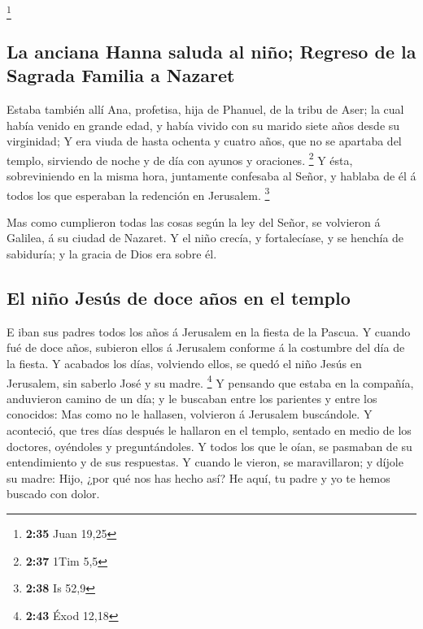 \footnote{\textbf{2:35} Juan 19,25}

\hypertarget{la-anciana-hanna-saluda-al-niuxf1o-regreso-de-la-sagrada-familia-a-nazaret}{%
\subsection{La anciana Hanna saluda al niño; Regreso de la Sagrada
Familia a
Nazaret}\label{la-anciana-hanna-saluda-al-niuxf1o-regreso-de-la-sagrada-familia-a-nazaret}}

 Estaba también allí Ana, profetisa, hija de Phanuel, de la
tribu de Aser; la cual había venido en grande edad, y había vivido con
su marido siete años desde su virginidad;  Y era viuda de
hasta ochenta y cuatro años, que no se apartaba del templo, sirviendo de
noche y de día con ayunos y oraciones. \footnote{\textbf{2:37} 1Tim 5,5}
 Y ésta, sobreviniendo en la misma hora, juntamente
confesaba al Señor, y hablaba de él á todos los que esperaban la
redención en Jerusalem. \footnote{\textbf{2:38} Is 52,9}

 Mas como cumplieron todas las cosas según la ley del
Señor, se volvieron á Galilea, á su ciudad de Nazaret.  Y
el niño crecía, y fortalecíase, y se henchía de sabiduría; y la gracia
de Dios era sobre él.

\hypertarget{el-niuxf1o-jesuxfas-de-doce-auxf1os-en-el-templo}{%
\subsection{El niño Jesús de doce años en el
templo}\label{el-niuxf1o-jesuxfas-de-doce-auxf1os-en-el-templo}}

 E iban sus padres todos los años á Jerusalem en la fiesta
de la Pascua.  Y cuando fué de doce años, subieron ellos á
Jerusalem conforme á la costumbre del día de la fiesta.  Y
acabados los días, volviendo ellos, se quedó el niño Jesús en Jerusalem,
sin saberlo José y su madre. \footnote{\textbf{2:43} Éxod 12,18}
 Y pensando que estaba en la compañía, anduvieron camino de
un día; y le buscaban entre los parientes y entre los conocidos:
 Mas como no le hallasen, volvieron á Jerusalem buscándole.
 Y aconteció, que tres días después le hallaron en el
templo, sentado en medio de los doctores, oyéndoles y preguntándoles.
 Y todos los que le oían, se pasmaban de su entendimiento y
de sus respuestas.  Y cuando le vieron, se maravillaron; y
díjole su madre: Hijo, ¿por qué nos has hecho así? He aquí, tu padre y
yo te hemos buscado con dolor.

